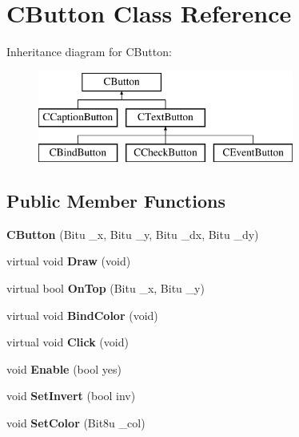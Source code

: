 \hypertarget{classCButton}{\section{C\-Button Class Reference}
\label{classCButton}
}
Inheritance diagram for C\-Button\-:\begin{figure}[H]
\begin{center}
\leavevmode
\includegraphics[height=3.000000cm]{classCButton}
\end{center}
\end{figure}
\subsection*{Public Member Functions}
\begin{DoxyCompactItemize}
\item 
\hypertarget{classCButton_acb852749fa38d2484ca1de00df13bcf4}{{\bfseries C\-Button} (Bitu \-\_\-x, Bitu \-\_\-y, Bitu \-\_\-dx, Bitu \-\_\-dy)}\label{classCButton_acb852749fa38d2484ca1de00df13bcf4}

\item 
\hypertarget{classCButton_a78a06b7c9e6994399c993f1af9ee38b8}{virtual void {\bfseries Draw} (void)}\label{classCButton_a78a06b7c9e6994399c993f1af9ee38b8}

\item 
\hypertarget{classCButton_a9eee48a08f92ab14f41d4a62f1bfb1d4}{virtual bool {\bfseries On\-Top} (Bitu \-\_\-x, Bitu \-\_\-y)}\label{classCButton_a9eee48a08f92ab14f41d4a62f1bfb1d4}

\item 
\hypertarget{classCButton_aa31add179ce4c1b0c2efb99cf7da5678}{virtual void {\bfseries Bind\-Color} (void)}\label{classCButton_aa31add179ce4c1b0c2efb99cf7da5678}

\item 
\hypertarget{classCButton_ae56bdd7d3c4fb7e2e1f0634e5dbe1cc7}{virtual void {\bfseries Click} (void)}\label{classCButton_ae56bdd7d3c4fb7e2e1f0634e5dbe1cc7}

\item 
\hypertarget{classCButton_ab1661c655cd9ba77065f7944f89c162c}{void {\bfseries Enable} (bool yes)}\label{classCButton_ab1661c655cd9ba77065f7944f89c162c}

\item 
\hypertarget{classCButton_a44707745a86d060e0891f0d8b55c243a}{void {\bfseries Set\-Invert} (bool inv)}\label{classCButton_a44707745a86d060e0891f0d8b55c243a}

\item 
\hypertarget{classCButton_a3530826dc5f15b557074560e255d6672}{void {\bfseries Set\-Color} (Bit8u \-\_\-col)}\label{classCButton_a3530826dc5f15b557074560e255d6672}

\end{DoxyCompactItemize}
